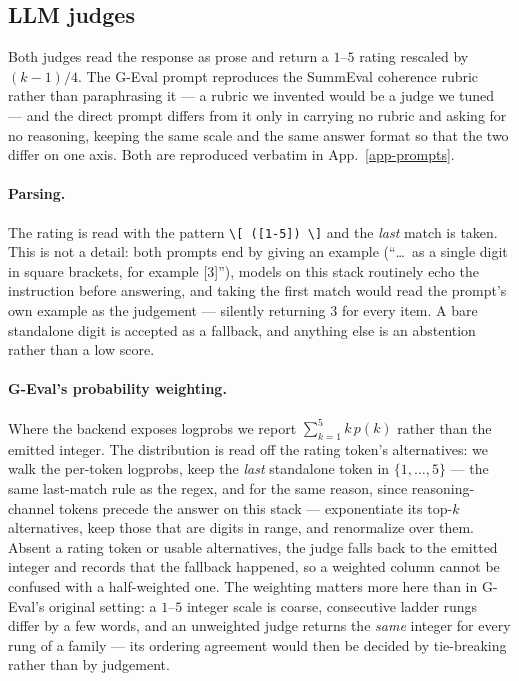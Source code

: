 \subsection{LLM judges}
\label{app-baseline-judges}

Both judges read the response as prose and return a $1$--$5$ rating rescaled by $(k-1)/4$. The G-Eval
prompt reproduces the SummEval coherence rubric rather than paraphrasing it --- a rubric we invented
would be a judge we tuned --- and the direct prompt differs from it only in carrying no rubric and
asking for no reasoning, keeping the same scale and the same answer format so that the two differ on
one axis. Both are reproduced verbatim in App.~\ref{app-prompts}.

\paragraph{Parsing.} The rating is read with the pattern \texttt{\textbackslash[\,([1-5])\,\textbackslash]}
and the \emph{last} match is taken. This is not a detail: both prompts end by giving an example
(``\dots\ as a single digit in square brackets, for example [3]''), models on this stack routinely echo
the instruction before answering, and taking the first match would read the prompt's own example as
the judgement --- silently returning $3$ for every item. A bare standalone digit is accepted as a
fallback, and anything else is an abstention rather than a low score.

\paragraph{G-Eval's probability weighting.} Where the backend exposes logprobs we report
$\sum_{k=1}^{5} k\,p(k)$ rather than the emitted integer. The distribution is read off the rating
token's alternatives: we walk the per-token logprobs, keep the \emph{last} standalone token in
$\{1,\dots,5\}$ --- the same last-match rule as the regex, and for the same reason, since
reasoning-channel tokens precede the answer on this stack --- exponentiate its top-$k$ alternatives,
keep those that are digits in range, and renormalize over them. Absent a rating token or usable
alternatives, the judge falls back to the emitted integer and records that the fallback happened, so a
weighted column cannot be confused with a half-weighted one. The weighting matters more here than in
G-Eval's original setting: a $1$--$5$ integer scale is coarse, consecutive ladder rungs differ by a few
words, and an unweighted judge returns the \emph{same} integer for every rung of a family --- its
ordering agreement would then be decided by tie-breaking rather than by judgement.

